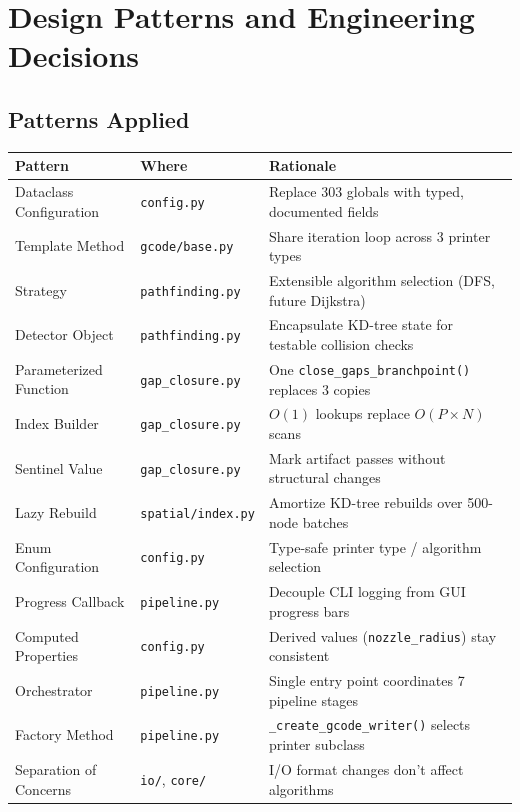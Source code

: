 \documentclass[11pt,a4paper]{article}
\begin{document}
\section{Design Patterns and Engineering Decisions}

\subsection{Patterns Applied}

\begin{longtable}{p{4cm}p{3.5cm}p{6.5cm}}
\toprule
\textbf{Pattern} & \textbf{Where} & \textbf{Rationale} \\
\midrule
\endhead
Dataclass Configuration & \texttt{config.py} & Replace 303 globals with typed, documented fields \\
Template Method & \texttt{gcode/base.py} & Share iteration loop across 3 printer types \\
Strategy & \texttt{pathfinding.py} & Extensible algorithm selection (DFS, future Dijkstra) \\
Detector Object & \texttt{pathfinding.py} & Encapsulate KD-tree state for testable collision checks \\
Parameterized Function & \texttt{gap\_closure.py} & One \texttt{close\_gaps\_branchpoint()} replaces 3 copies \\
Index Builder & \texttt{gap\_closure.py} & $O(1)$ lookups replace $O(P \times N)$ scans \\
Sentinel Value & \texttt{gap\_closure.py} & Mark artifact passes without structural changes \\
Lazy Rebuild & \texttt{spatial/index.py} & Amortize KD-tree rebuilds over 500-node batches \\
Enum Configuration & \texttt{config.py} & Type-safe printer type / algorithm selection \\
Progress Callback & \texttt{pipeline.py} & Decouple CLI logging from GUI progress bars \\
Computed Properties & \texttt{config.py} & Derived values (\texttt{nozzle\_radius}) stay consistent \\
Orchestrator & \texttt{pipeline.py} & Single entry point coordinates 7 pipeline stages \\
Factory Method & \texttt{pipeline.py} & \texttt{\_create\_gcode\_writer()} selects printer subclass \\
Separation of Concerns & \texttt{io/}, \texttt{core/} & I/O format changes don't affect algorithms \\
\bottomrule
\end{longtable}
\end{document}
